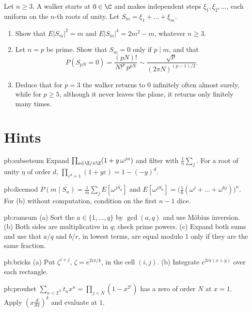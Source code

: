 \begin{exercise}[$\star\star\star$]\label{pb:rootwalk}
Let $n\ge3$. A walker starts at $0\in\C$ and makes independent steps $\xi_1,\xi_2,\dots$, each uniform on the $n$-th roots
of unity. Let $S_m=\xi_1+\dots+\xi_m$.
\begin{enumerate}[label=(\alph*)]
\item Show that $E|S_m|^2=m$ and $E|S_m|^4=2m^2-m$, whatever $n\ge3$.
\item Let $n=p$ be prime. Show that $S_m=0$ only if $p\mid m$, and that
\[
P(S_{pN}=0)=\frac{(pN)!}{N!^p\,p^{pN}}\sim\frac{\sqrt p}{(2\pi N)^{(p-1)/2}}.
\]
\item Deduce that for $p=3$ the walker returns to $0$ infinitely often almost surely, while for $p\ge5$, although it never
leaves the plane, it returns only finitely many times.
\end{enumerate}
\end{exercise}

\section{Hints}

\begin{hint}{pb:subsetsum}
Expand $\prod_{a\in\Z/n\Z}(1+y\,\omega^{ja})$ and filter with $\frac1n\sum_j$. For a root of unity $\eta$ of order $d$,
$\prod_{\varepsilon^d=1}(1+y\varepsilon)=1-(-y)^d$.
\end{hint}

\begin{hint}{pb:dicemod}
$P(m\mid S_n)=\frac1m\sum_{j}E[\omega^{jS_n}]$ and $E[\omega^{jS_n}]=\bigl(\frac16(\omega^j+\dots+\omega^{6j})\bigr)^n$. For
(b) without computation, condition on the first $n-1$ dice.
\end{hint}

\begin{hint}{pb:ramsum}
(a) Sort the $a\in\{1,\dots,q\}$ by $\gcd(a,q)$ and use Möbius inversion. (b) Both sides are multiplicative in $q$; check
prime powers. (c) Expand both sums and use that $a/q$ and $b/r$, in lowest terms, are equal modulo $1$ only if they are
the same fraction.
\end{hint}

\begin{hint}{pb:bricks}
(a) Put $\zeta^{i+j}$, $\zeta=e^{2i\pi/k}$, in the cell $(i,j)$. (b) Integrate $e^{2i\pi(x+y)}$ over each rectangle.
\end{hint}

\begin{hint}{pb:prouhet}
$\sum_{n<2^N}t_nx^n=\prod_{j<N}(1-x^{2^j})$ has a zero of order $N$ at $x=1$. Apply $(x\frac d{dx})^k$ and evaluate at $1$.
\end{hint}

